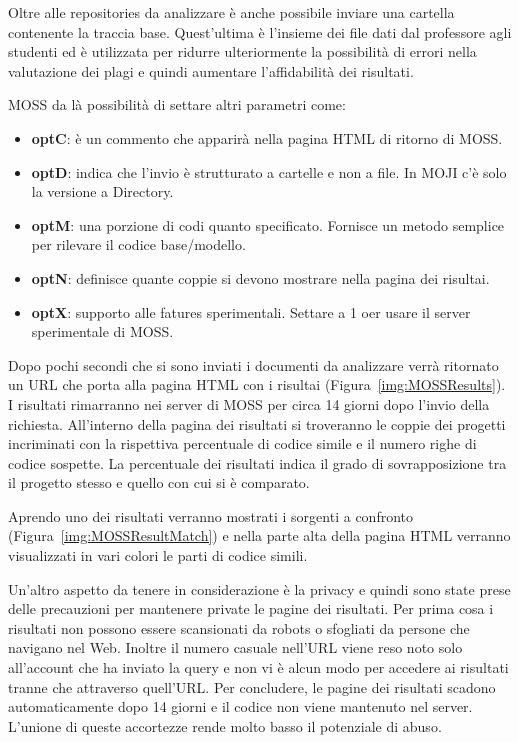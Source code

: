 			Oltre alle repositories da analizzare è anche possibile inviare una cartella contenente la traccia base. Quest'ultima è l'insieme dei file dati dal professore agli studenti ed è utilizzata per ridurre ulteriormente la possibilità di errori nella valutazione dei plagi e quindi aumentare l'affidabilità dei risultati.
			
			MOSS da là possibilità di settare altri parametri come: 
			\begin{itemize}
				\item \textbf{optC}: è un commento che apparirà nella pagina HTML di ritorno di MOSS.
				\item \textbf{optD}: indica che l'invio è strutturato a cartelle e non a file. In MOJI c'è solo la versione a Directory.
				\item \textbf{optM}: una porzione di codi quanto specificato. Fornisce un metodo semplice per rilevare il codice base/modello.
				\item \textbf{optN}: definisce quante coppie si devono mostrare nella pagina dei risultai.
				\item \textbf{optX}: supporto alle fatures sperimentali. Settare a 1 oer usare il server sperimentale di MOSS.
			\end{itemize}
			
			Dopo pochi secondi che si sono inviati i documenti da analizzare verrà ritornato un URL che porta alla pagina HTML con i risultai (Figura~\ref{img:MOSSResults}). I risultati rimarranno nei server di MOSS per circa 14 giorni dopo l'invio della richiesta. All'interno della pagina dei risultati si troveranno le coppie dei progetti incriminati con la rispettiva percentuale di codice simile e il numero righe di codice sospette. La percentuale dei risultati indica il grado di sovrapposizione tra il progetto stesso e quello con cui si è comparato.
			
			\begin{center}
				\label{img:MOSSResults}
			\end{center}
			
			Aprendo uno dei risultati verranno mostrati i sorgenti a confronto (Figura~\ref{img:MOSSResultMatch}) e nella parte alta della pagina HTML verranno visualizzati in vari colori le parti di codice simili.
			\begin{center}
				\label{img:MOSSResultMatch}
			\end{center}
			
			Un'altro aspetto da tenere in considerazione è la privacy e quindi sono state prese delle precauzioni per mantenere private le pagine dei risultati. Per prima cosa i risultati non possono essere scansionati da robots o sfogliati da persone che navigano nel Web. Inoltre il numero casuale nell'URL viene reso noto solo all'account che ha inviato la query e non vi è alcun modo per accedere ai risultati tranne che attraverso quell'URL. Per concludere, le pagine dei risultati scadono automaticamente dopo 14 giorni e il codice non viene mantenuto nel server. L'unione di queste accortezze rende molto basso il potenziale di abuso.